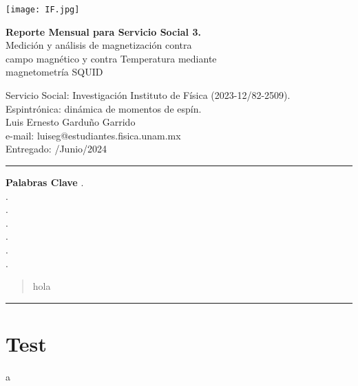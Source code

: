 \documentclass[letterpaper]{article}
\newcommand{\neod}{\ce{NdFeO3}}
\begin{document}
\texttt{[image: IF.jpg]}
\vspace{-4cm}

\begin{flushleft}
\hspace{3.85 cm}\LARGE \textbf{Reporte Mensual para Servicio Social 3.}\\
\hspace{3.75 cm} Medición y análisis de magnetización contra\\
\hspace{3.75 cm} campo magnético y contra Temperatura mediante\\
\hspace{3.75 cm} magnetometría SQUID\\
\end{flushleft}


\begin{flushleft}
\hspace{3.75 cm} \large Servicio Social: Investigación Instituto de Física (2023-12/82-2509).\\
\hspace{3.75 cm} Espintrónica: dinámica de momentos de espín.\\
\hspace{3.75 cm} Luis Ernesto Garduño Garrido\\
\vspace{0.25 cm}
\normalsize \hspace{3.75 cm} e-mail: luiseg@estudiantes.fisica.unam.mx \\
\hspace{3.75 cm} Entregado: /Junio/2024
\end{flushleft}
\hrule
\begin{minipage}[t]{4.5 cm}
\vspace{5 pt}
\centering \footnotesize\textbf{Palabras Clave}
\justify
. \neod\\
. \\
. \\
. \\
. \\
. \\
. 
\end{minipage}
\begin{minipage}[t]{12 cm}
\vspace{5 pt}
\begin{abstract}
    hola
\end{abstract}
\end{minipage}
\vspace{5 pt}
\hrule
\section{Test}
a
\end{document}
